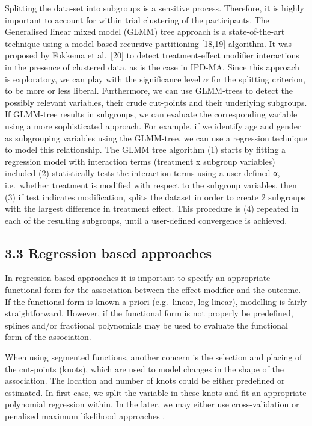 \documentclass[14pt,]{article}
\begin{document}
Splitting the data-set into subgroups is a sensitive process. Therefore,
it is highly important to account for within trial clustering of the
participants. The Generalised linear mixed model (GLMM) tree approach is
a state-of-the-art technique using a model-based recursive partitioning
{[}18,19{]} algorithm. It was proposed by Fokkema et al.~{[}20{]} to
detect treatment-effect modifier interactions in the presence of
clustered data, as is the case in IPD-MA. Since this approach is
exploratory, we can play with the significance level \(\alpha\) for the
splitting criterion, to be more or less liberal. Furthermore, we can use
GLMM-trees to detect the possibly relevant variables, their crude
cut-points and their underlying subgroups. If GLMM-tree results in
subgroups, we can evaluate the corresponding variable using a more
sophisticated approach. For example, if we identify age and gender as
subgrouping variables using the GLMM-tree, we can use a regression
technique to model this relationship. The GLMM tree algorithm (1) starts
by fitting a regression model with interaction terms (treatment x
subgroup variables) included (2) statistically tests the interaction
terms using a user-defined α, i.e.~whether treatment is modified with
respect to the subgroup variables, then (3) if test indicates
modification, splits the dataset in order to create 2 subgroups with the
largest difference in treatment effect. This procedure is (4) repeated
in each of the resulting subgroups, until a user-defined convergence is
achieved.

\hypertarget{regression-based-approaches}{%
\subsection{3.3 Regression based
approaches}\label{regression-based-approaches}}

\par

In regression-based approaches it is important to specify an appropriate
functional form for the association between the effect modifier and the
outcome. If the functional form is known a priori (e.g.~linear,
log-linear), modelling is fairly straightforward. However, if the
functional form is not properly be predefined, splines and/or fractional
polynomials may be used to evaluate the functional form of the
association.

\par

When using segmented functions, another concern is the selection and
placing of the cut-points (knots), which are used to model changes in
the shape of the association. The location and number of knots could be
either predefined or estimated. In first case, we split the variable in
these knots and fit an appropriate polynomial regression within. In the
later, we may either use cross-validation or penalised maximum
likelihood approaches .
\end{document}
